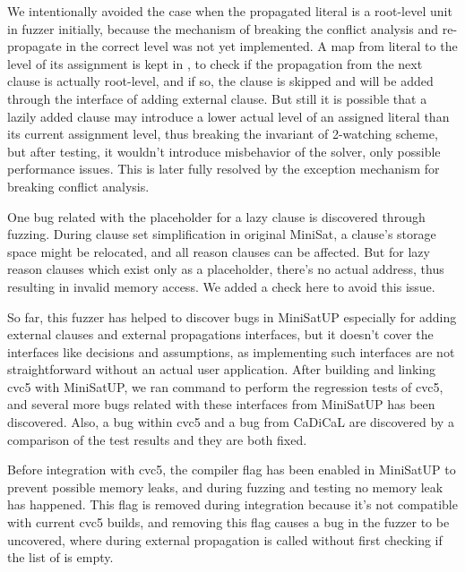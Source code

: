 We intentionally avoided the case when the propagated literal is a root-level unit in fuzzer initially, because the mechanism of breaking the conflict analysis and re-propagate in the correct level was not yet implemented. A map from literal to the level of its assignment is kept in , to check if the propagation from the next clause is actually root-level, and if so, the clause is skipped and will be added through the interface of adding external clause. But still it is possible that a lazily added clause may introduce a lower actual level of an assigned literal than its current assignment level, thus breaking the invariant of 2-watching scheme, but after testing, it wouldn't introduce misbehavior of the solver, only possible performance issues. This is later fully resolved by the exception mechanism for breaking conflict analysis.

One bug related with the placeholder for a lazy clause is discovered through fuzzing. During clause set simplification in original MiniSat, a clause's storage space might be relocated, and all reason clauses can be affected. But for lazy reason clauses which exist only as a placeholder, there's no actual address, thus resulting in invalid memory access. We added a check here to avoid this issue.

So far, this fuzzer has helped to discover bugs in MiniSatUP especially for adding external clauses and external propagations interfaces, but it doesn't cover the interfaces like decisions and assumptions, as implementing such interfaces are not straightforward without an actual user application. After building and linking cvc5 with MiniSatUP, we ran  command to perform the regression tests of cvc5, and several more bugs related with these interfaces from MiniSatUP has been discovered. Also, a bug within cvc5 and a bug from CaDiCaL are discovered by a comparison of the test results and they are both fixed.

Before integration with cvc5, the compiler flag  has been enabled in MiniSatUP to prevent possible memory leaks, and during fuzzing and testing no memory leak has happened. This flag is removed during integration because it's not compatible with current cvc5 builds, and removing this flag causes a bug in the fuzzer to be uncovered, where during external propagation  is called without first checking if the list of  is empty.

